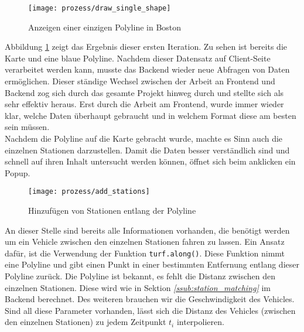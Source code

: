 \begin{newpage}
      \begin{figure}[htbp]
        \begin{center}
          \texttt{[image: prozess/draw\_single\_shape]}
          \caption{Anzeigen einer einzigen Polyline in Boston}
          \label{fig:prozess/draw_single_shape}
        \end{center}
      \end{figure}
      
      Abbildung \ref{fig:prozess/draw_single_shape} zeigt das Ergebnis dieser ersten Iteration. Zu sehen ist bereits die Karte und eine blaue Polyline. Nachdem dieser Datensatz auf Client-Seite verarbeitet werden kann, musste das Backend wieder neue Abfragen von Daten ermöglichen. Dieser ständige Wechsel zwischen der Arbeit an Frontend und Backend zog sich durch das gesamte Projekt hinweg durch und stellte sich als sehr effektiv heraus. Erst durch die Arbeit am Frontend, wurde immer wieder klar, welche Daten überhaupt gebraucht und in welchem Format diese am besten sein müssen.\\

      Nachdem die Polyline auf die Karte gebracht wurde, machte es Sinn auch die einzelnen Stationen darzustellen. Damit die Daten besser verständlich sind und schnell auf ihren Inhalt untersucht werden können, öffnet sich beim anklicken ein Popup.

      \begin{figure}[htbp]
        \begin{center}
          \texttt{[image: prozess/add\_stations]}
          \caption{Hinzufügen von Stationen entlang der Polyline}
          \label{fig:prozess/add_stations}
        \end{center}
      \end{figure}

      An dieser Stelle sind bereits alle Informationen vorhanden, die benötigt werden um ein Vehicle zwischen den einzelnen Stationen fahren zu lassen. Ein Ansatz dafür, ist die Verwendung der Funktion \texttt{turf.along()}. Diese Funktion nimmt eine Polyline und gibt einen Punkt in einer bestimmten Entfernung entlang dieser Polyline zurück. Die Polyline ist bekannt, es fehlt die Distanz zwischen den einzelnen Stationen. Diese wird wie in Sektion \textit{\ref{ssub:station_matching} } im Backend berechnet. Des weiteren brauchen wir die Geschwindigkeit des Vehicles. Sind all diese Parameter vorhanden, lässt sich die Distanz des Vehicles (zwischen den einzelnen Stationen) zu jedem Zeitpunkt $t_i$ interpolieren.


\end{newpage}

